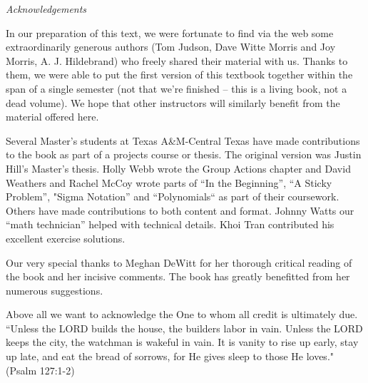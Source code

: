 \noindent
\emph{Acknowledgements}
\smallskip

In our preparation of this text, we were fortunate to find via the web  some extraordinarily generous authors (Tom Judson, Dave Witte Morris and Joy Morris, A. J. Hildebrand) who freely shared their material with us. Thanks to them, we were able to put the first version of this  textbook together within the span of a single semester (not that we're finished -- this is a living book, not a dead volume). We hope that other instructors will similarly benefit from the material offered here.  

Several Master's students at Texas A\&M-Central Texas have made contributions to the book as part of a projects course or thesis. The original version was Justin Hill's Master's thesis. Holly Webb wrote the Group Actions chapter and David Weathers and Rachel McCoy wrote parts of ``In the Beginning'', ``A Sticky Problem'', "Sigma Notation'' and ``Polynomials``  as part of their coursework. Others have made contributions to both content and format. Johnny Watts our ``math technician'' helped with technical details. Khoi Tran contributed his excellent exercise solutions. 

Our very special thanks to Meghan DeWitt for her thorough critical reading of the book and her incisive comments. The book has greatly benefitted from her numerous suggestions.
\medskip 

Above all we want to acknowledge the One to whom all credit is ultimately due. ``Unless the LORD builds the house, the builders labor in vain. Unless the LORD keeps the city, the watchman is wakeful in vain.  It is vanity to rise up early, stay up late, and eat the bread of sorrows, for He gives sleep to those He loves."  (Psalm 127:1-2)

